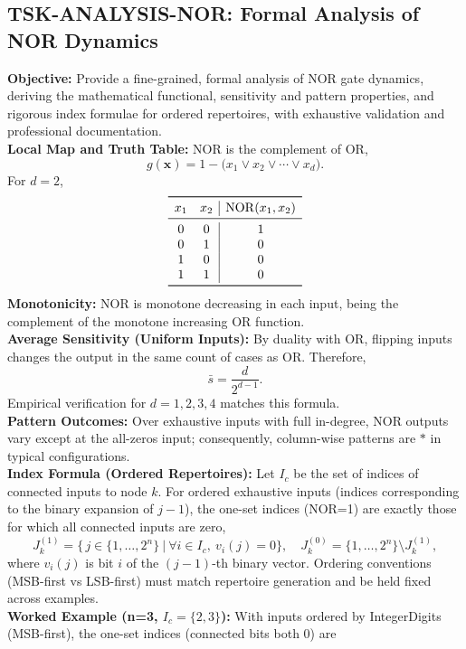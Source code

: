 \documentclass[11pt]{article}
\begin{document}
\subsection{TSK-ANALYSIS-NOR: Formal Analysis of NOR Dynamics}
\textbf{Objective:} Provide a fine-grained, formal analysis of NOR gate dynamics, deriving the mathematical functional, sensitivity and pattern properties, and rigorous index formulae for ordered repertoires, with exhaustive validation and professional documentation.\\
\textbf{Local Map and Truth Table:} NOR is the complement of OR,
\[
g(\mathbf{x}) = 1 - \big( x_1 \lor x_2 \lor \cdots \lor x_d \big).
\]
For \(d=2\),
\[
\begin{array}{cc|c}
\toprule
 x_1 & x_2 & \mathrm{NOR}(x_1,x_2) \\
\midrule
 0 & 0 & 1 \\
 0 & 1 & 0 \\
 1 & 0 & 0 \\
 1 & 1 & 0 \\
\bottomrule
\end{array}
\]
\textbf{Monotonicity:} NOR is monotone decreasing in each input, being the complement of the monotone increasing OR function.\\
\textbf{Average Sensitivity (Uniform Inputs):} By duality with OR, flipping inputs changes the output in the same count of cases as OR. Therefore,
\[
\bar{s} = \frac{d}{2^{d-1}}.
\]
Empirical verification for \(d=1,2,3,4\) matches this formula.\\
\textbf{Pattern Outcomes:} Over exhaustive inputs with full in-degree, NOR outputs vary except at the all-zeros input; consequently, column-wise patterns are \(*\) in typical configurations.\\
\textbf{Index Formula (Ordered Repertoires):} Let \(I_c\) be the set of indices of connected inputs to node \(k\). For ordered exhaustive inputs (indices corresponding to the binary expansion of \(j-1\)), the one-set indices (NOR=1) are exactly those for which all connected inputs are zero,
\[
J_k^{(1)} = \big\{\, j \in \{1,\dots,2^n\} \ \big|\ \forall i \in I_c,\ v_i(j) = 0 \big\},\quad J_k^{(0)} = \{1,\dots,2^n\} \setminus J_k^{(1)},
\]
where \(v_i(j)\) is bit \(i\) of the \((j-1)\)-th binary vector. Ordering conventions (MSB-first vs LSB-first) must match repertoire generation and be held fixed across examples.\\
\textbf{Worked Example (n=3, \(I_c=\{2,3\}\)):} With inputs ordered by IntegerDigits (MSB-first), the one-set indices (connected bits both 0) are
\end{document}
